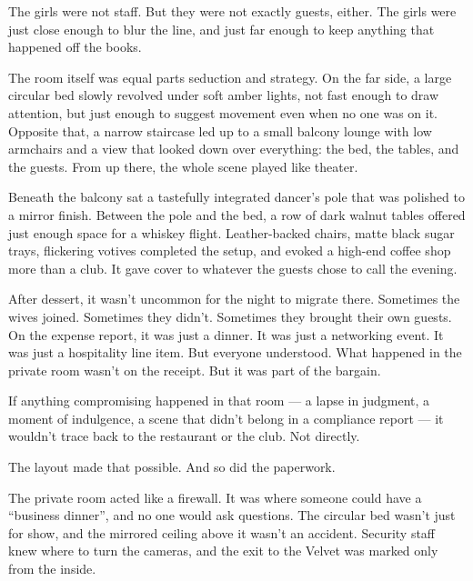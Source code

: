 \medskip 

The girls were not staff. But they were not exactly guests, either. The girls were just close 
enough to blur the line, and just far enough to keep anything that happened off the books.

The room itself was equal parts seduction and strategy. On the far side, a 
large circular bed 
slowly revolved under soft amber lights, not fast enough to draw attention, but just enough to suggest movement even when no 
one was on it. Opposite that, a narrow staircase led up to a small balcony lounge with low armchairs and a view that looked 
down over everything: the bed, the tables, and the guests. From up there, the whole scene played like theater.

Beneath the balcony sat a tastefully integrated dancer’s pole that was polished to a mirror finish.
Between the pole and the bed, a row of dark walnut tables offered just enough space for a whiskey flight.
Leather-backed chairs, matte black sugar trays, flickering votives completed the setup, and evoked a high-end coffee shop 
more than a club. It gave cover to whatever the guests chose to call the evening.


After dessert, it wasn’t uncommon for the night to 
migrate there.  Sometimes the wives joined. Sometimes they didn’t.  Sometimes 
they brought their own guests.  On the expense report, it was just a dinner.  It was just a networking event.  
It was just a hospitality line item.  But everyone understood. What happened in the private room wasn’t on the receipt.  
But it was part of the bargain.

If anything compromising happened in that room — a lapse in judgment, a moment of indulgence, a scene that didn’t belong 
in a compliance report — it wouldn’t trace back to the restaurant or the club. Not directly.

The layout made that possible. And so did the paperwork.

The private room acted like a firewall. It was where someone could have a ``business dinner'', and no one would ask questions. 
The circular bed wasn’t just for show, and the mirrored ceiling above it wasn’t an accident. 
Security staff knew where to turn the cameras, and the exit to the Velvet was marked only from the inside. 

\medskip

